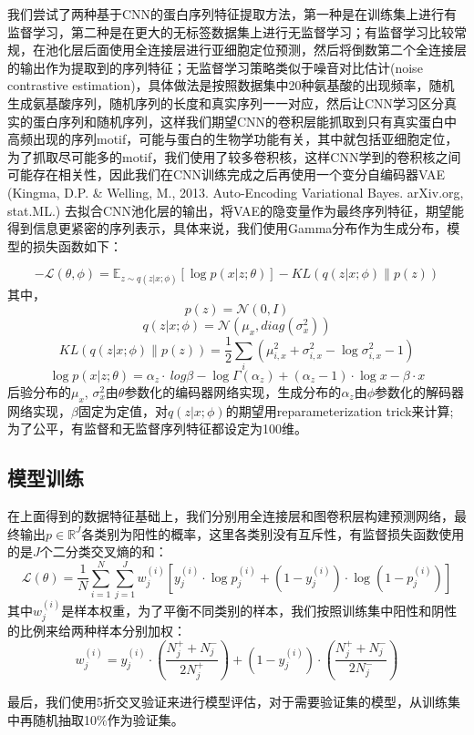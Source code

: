 \documentclass[a4paper,UTF8]{article}
\begin{document}
我们尝试了两种基于CNN的蛋白序列特征提取方法，第一种是在训练集上进行有监督学习，第二种是在更大的无标签数据集上进行无监督学习；有监督学习比较常规，在池化层后面使用全连接层进行亚细胞定位预测，然后将倒数第二个全连接层的输出作为提取到的序列特征；无监督学习策略类似于噪音对比估计(noise contrastive estimation)，具体做法是按照数据集中20种氨基酸的出现频率，随机生成氨基酸序列，随机序列的长度和真实序列一一对应，然后让CNN学习区分真实的蛋白序列和随机序列，这样我们期望CNN的卷积层能抓取到只有真实蛋白中高频出现的序列motif，可能与蛋白的生物学功能有关，其中就包括亚细胞定位，为了抓取尽可能多的motif，我们使用了较多卷积核，这样CNN学到的卷积核之间可能存在相关性，因此我们在CNN训练完成之后再使用一个变分自编码器VAE (Kingma, D.P. $\&$ Welling, M., 2013. Auto-Encoding Variational Bayes. arXiv.org, stat.ML.) 去拟合CNN池化层的输出，将VAE的隐变量作为最终序列特征，期望能得到信息更紧密的序列表示，具体来说，我们使用Gamma分布作为生成分布，模型的损失函数如下：

$$-\mathcal L(\theta, \phi) = \mathbb E_{z \sim q(z|x;\phi)} [\log p(x|z;\theta)] - KL(q(z|x;\phi) \parallel p(z))$$
其中，
$$p(z)=\mathcal N(0, I)$$
$$q(z|x;\phi)=\mathcal N(\mu_x, diag(\sigma_x^2))$$
$$KL(q(z|x;\phi) \parallel p(z)) = \frac 1 2 \sum_i (\mu_{i,x}^2 + \sigma_{i,x}^2 - \log \sigma_{i,x}^2 - 1)$$
$$\log p(x|z;\theta)=\alpha_z \cdot\ log \beta - \log \Gamma(\alpha_z) + (\alpha_z - 1) \cdot \log x - \beta \cdot x$$
后验分布的$\mu_x$, $\sigma_x^2$由$\theta$参数化的编码器网络实现，生成分布的$\alpha_z$由$\phi$参数化的解码器网络实现，$\beta$固定为定值，对$q(z|x;\phi)$的期望用reparameterization trick来计算;
为了公平，有监督和无监督序列特征都设定为100维。

\subsection{模型训练}

在上面得到的数据特征基础上，我们分别用全连接层和图卷积层构建预测网络，最终输出$p \in \mathbb R^J$各类别为阳性的概率，这里各类别没有互斥性，有监督损失函数使用的是$J$个二分类交叉熵的和：
$$\mathcal L(\theta) = \frac{1}{N} \sum_{i=1}^N \sum_{j=1}^{J} w_j^{(i)} [y_j^{(i)}\cdot \log p_j^{(i)} + (1-y_j^{(i)})\cdot \log (1-p_j^{(i)})] $$
其中$w_j^{(i)}$是样本权重，为了平衡不同类别的样本，我们按照训练集中阳性和阴性的比例来给两种样本分别加权：
$$w_j^{(i)}=y_j^{(i)} \cdot (\frac {N_j^+ + N_j^-} {2N_j^+}) + (1-y_j^{(i)}) \cdot (\frac {N_j^+ +N_j^-} {2N_j^-})$$

最后，我们使用5折交叉验证来进行模型评估，对于需要验证集的模型，从训练集中再随机抽取10\%作为验证集。\\
\end{document}
